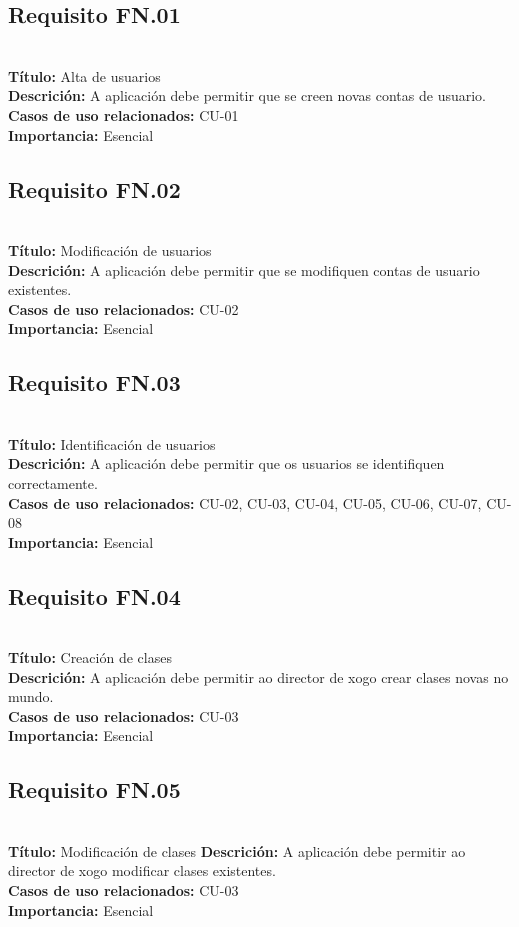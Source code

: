 \subsection{Requisito FN.01}~\\
{\bf Título:} Alta de usuarios\\
{\bf Descrición:} A aplicación debe permitir que se creen novas contas de usuario.\\
{\bf Casos de uso relacionados:} CU-01\\
{\bf Importancia:} Esencial

\subsection{Requisito FN.02}~\\
{\bf Título:} Modificación de usuarios\\
{\bf Descrición:} A aplicación debe permitir que se modifiquen contas de usuario existentes.\\
{\bf Casos de uso relacionados:} CU-02\\
{\bf Importancia:} Esencial

\subsection{Requisito FN.03}~\\
{\bf Título:} Identificación de usuarios\\
{\bf Descrición:} A aplicación debe permitir que os usuarios se identifiquen correctamente.\\
{\bf Casos de uso relacionados:} CU-02, CU-03, CU-04, CU-05, CU-06, CU-07, CU-08\\
{\bf Importancia:} Esencial

\subsection{Requisito FN.04}~\\
{\bf Título:} Creación de clases\\
{\bf Descrición:} A aplicación debe permitir ao director de xogo crear clases novas no mundo.\\
{\bf Casos de uso relacionados:} CU-03\\
{\bf Importancia:} Esencial

\subsection{Requisito FN.05}~\\
{\bf Título:} Modificación de clases
{\bf Descrición:} A aplicación debe permitir ao director de xogo modificar clases existentes.\\
{\bf Casos de uso relacionados:} CU-03\\
{\bf Importancia:} Esencial

